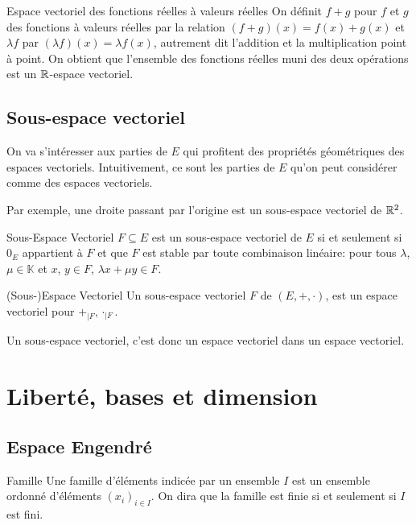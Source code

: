 \documentclass{classe}
\renewcommand*{\K}{\mathbb{K}}
\begin{document}
\begin{théorème}{Espace vectoriel des fonctions réelles à valeurs réelles}{}
	On définit $f+g$ pour $f$ et $g$ des fonctions à valeurs réelles par la relation $(f+g)(x) = f(x)+g(x)$ et $\lambda f$ par $(\lambda f)(x) = \lambda f(x)$, autrement dit l'addition et la multiplication point à point.
	On obtient que l'ensemble des fonctions réelles muni des deux opérations est un $\mathbb{R}$-espace vectoriel.
\end{théorème}

\subsection{Sous-espace vectoriel}

On va s'intéresser aux parties de $E$ qui profitent des propriétés géométriques des espaces vectoriels. Intuitivement, ce sont les parties de $E$ qu'on peut considérer comme des espaces vectoriels.

\begin{example}{}
	Par exemple, une droite passant par l'origine est un sous-espace vectoriel de $\mathbb{R}^2$.
\end{example}

\begin{définition}{Sous-Espace Vectoriel}{}
	$F \subseteq E$ est un sous-espace vectoriel de $E$ si et seulement si $0_E$ appartient à $F$ et que $F$ est stable par toute combinaison linéaire: pour tous $\lambda$, $\mu \in \K$ et $x$, $y\in F$, $\lambda x + \mu y \in F$.
\end{définition}

\begin{propositionfr}{(Sous-)Espace Vectoriel}{}
	Un sous-espace vectoriel $F$ de $\left( E, +, \cdot \right)$, est un espace vectoriel pour $+_{\mid F}, \cdot_{\mid F}$.
\end{propositionfr}

Un sous-espace vectoriel, c'est donc un espace vectoriel dans un espace vectoriel.

\section{Liberté, bases et dimension}
\subsection{Espace Engendré}
\begin{définition}{Famille}{}
	Une famille d'éléments indicée par un ensemble $I$ est un ensemble ordonné d'éléments $\left( x_{i} \right)_{i \in I}$.
	On dira que la famille est finie si et seulement si $I$ est fini.
\end{définition}
\end{document}
